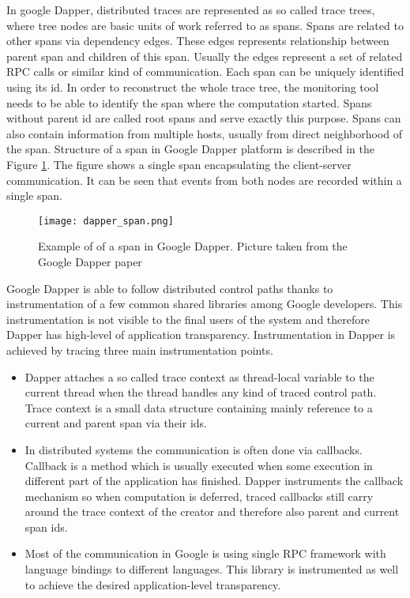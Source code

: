 In google Dapper, distributed traces are represented as so called trace trees, where tree nodes are basic units of work referred to as spans. Spans are related to other spans via dependency edges. These edges represents relationship between parent span and children of this span. Usually the edges represent a set of related RPC calls or similar kind of communication. Each span can be uniquely identified using its id. In order to reconstruct the whole trace tree, the monitoring tool needs to be able to identify the span where the computation started. Spans without parent id are called root spans and serve exactly this purpose. Spans can also contain information from multiple hosts, usually from direct neighborhood of the span. Structure of a span in Google Dapper platform is described in the Figure \ref{fig:dapper_span}. The figure shows a single span encapsulating the client-server communication. It can be seen that events from both nodes are recorded within a single span.
\begin{figure}
	\centering
		\texttt{[image: dapper\_span.png]}
	\caption{Example of of a span in Google Dapper. Picture taken from the Google Dapper paper}
	\label{fig:dapper_span}
\end{figure}

Google Dapper is able to follow distributed control paths thanks to instrumentation of a few common shared libraries among Google developers. This instrumentation is not visible to the final users of the system and therefore Dapper has high-level of application transparency. Instrumentation in Dapper is achieved by tracing three main instrumentation points. 
\begin{itemize}
	\item Dapper attaches a so called trace context as thread-local variable to the current thread when the thread handles any kind of traced control path. Trace context is a small data structure containing mainly reference to a current and parent span via their ids.
	
	\item In distributed systems the communication is often done via callbacks. Callback is a method which is usually executed when some execution in different part of the application has finished. Dapper instruments the callback mechanism so when computation is deferred, traced callbacks still carry around the trace context of the creator and therefore also parent and current span ids.
	
	\item Most of the communication in Google is using single RPC framework with language bindings to different languages. This library is instrumented as well to achieve the desired application-level transparency.
\end{itemize}

